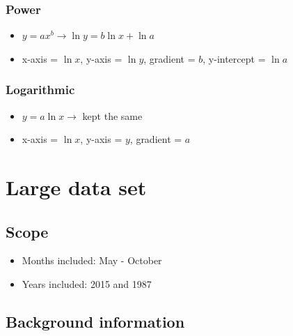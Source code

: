 \documentclass[A4paper, 11pt]{article}
\begin{document}
	\subsubsection{Power}
	\begin{itemize}
		\item $y=ax^b\rightarrow\ln y = b\ln x + \ln a$
		\item x-axis = $\ln x$, y-axis = $\ln y$, gradient = $b$, y-intercept = $\ln a$
	\end{itemize}
	
	\subsubsection{Logarithmic}
	\begin{itemize}
		\item $y=a\ln x\rightarrow$ kept the same
		\item x-axis = $\ln x$, y-axis = $y$, gradient = $a$
	\end{itemize}
	
	\pagebreak
	
	\section{Large data set}
	\subsection{Scope}
	\begin{itemize}
		\item Months included: May - October
		\item Years included: 2015 and 1987
	\end{itemize}
	\subsection{Background information}
\end{document}
